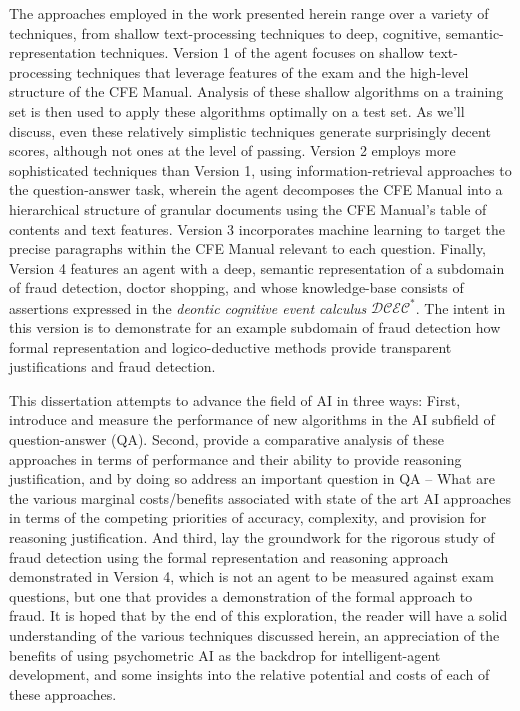The approaches employed in the work presented herein range over a variety of techniques, from shallow text-processing techniques to deep, cognitive, semantic-representation techniques.  Version 1 of the agent focuses on shallow text-processing techniques that leverage features of the exam and the high-level structure of the CFE Manual.  Analysis of these shallow algorithms on a training set is then used to apply these algorithms optimally on a test set.  As we'll discuss, even these relatively simplistic techniques generate surprisingly decent scores, although not ones at the level of passing.  Version 2 employs more sophisticated techniques than Version 1, using information-retrieval approaches to the question-answer task, wherein the agent decomposes the CFE Manual into a hierarchical structure of granular documents using the CFE Manual's table of contents and text features.  Version 3 incorporates machine learning to target the precise paragraphs within the CFE Manual relevant to each question.  Finally, Version 4 features an agent with a deep, semantic representation of a subdomain of fraud detection, doctor shopping, and whose knowledge-base consists of assertions expressed in the \textit{deontic cognitive event calculus} $\mathcal{DCEC}^\ast$.  The intent in this version is to demonstrate for an example subdomain of fraud detection how formal representation and logico-deductive methods provide transparent justifications and fraud detection. 

This dissertation attempts to advance the field of AI in three ways:  First, introduce and measure the performance of new algorithms in the AI subfield of question-answer (QA).  Second, provide a comparative analysis of these approaches in terms of performance and their ability to provide reasoning justification, and by doing so address an important question in QA -- What are the various marginal costs/benefits associated with state of the art AI approaches in terms of the competing priorities of accuracy, complexity, and provision for reasoning justification.  And third, lay the groundwork for the rigorous study of fraud detection using the formal representation and reasoning approach demonstrated in Version 4, which is not an agent to be measured against exam questions, but one that provides a demonstration of the formal approach to fraud.  It is hoped that by the end of this exploration, the reader will have a solid understanding of the various techniques discussed herein, an appreciation of the benefits of using psychometric AI as the backdrop for intelligent-agent development, and some insights into the relative potential and costs of each of these approaches.
